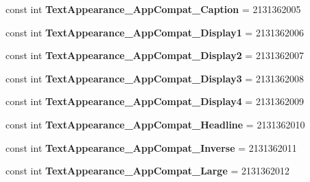 \begin{DoxyCompactItemize}
const int {\bfseries Text\+Appearance\+\_\+\+App\+Compat\+\_\+\+Caption} = 2131362005
\item 
\mbox{\label{class_pinned_app_1_1_droid_1_1_resource_1_1_style_a2f57dca80e42d93df5131cd962f5b9db}} 
const int {\bfseries Text\+Appearance\+\_\+\+App\+Compat\+\_\+\+Display1} = 2131362006
\item 
\mbox{\label{class_pinned_app_1_1_droid_1_1_resource_1_1_style_af2307b2f225c46a535f208bccf98fc51}} 
const int {\bfseries Text\+Appearance\+\_\+\+App\+Compat\+\_\+\+Display2} = 2131362007
\item 
\mbox{\label{class_pinned_app_1_1_droid_1_1_resource_1_1_style_a1ea5ccfacbe129d844dbea95ce0690ee}} 
const int {\bfseries Text\+Appearance\+\_\+\+App\+Compat\+\_\+\+Display3} = 2131362008
\item 
\mbox{\label{class_pinned_app_1_1_droid_1_1_resource_1_1_style_aa324ac75b9dd474fefa1ec75901c7c6b}} 
const int {\bfseries Text\+Appearance\+\_\+\+App\+Compat\+\_\+\+Display4} = 2131362009
\item 
\mbox{\label{class_pinned_app_1_1_droid_1_1_resource_1_1_style_a91b09d06fe0bf2c598e8fa3d52702df8}} 
const int {\bfseries Text\+Appearance\+\_\+\+App\+Compat\+\_\+\+Headline} = 2131362010
\item 
\mbox{\label{class_pinned_app_1_1_droid_1_1_resource_1_1_style_a70f14dd90b14de4a900332b146aa1db2}} 
const int {\bfseries Text\+Appearance\+\_\+\+App\+Compat\+\_\+\+Inverse} = 2131362011
\item 
\mbox{\label{class_pinned_app_1_1_droid_1_1_resource_1_1_style_af1bb9f77cbe3e9980fe7eb5d93367453}} 
const int {\bfseries Text\+Appearance\+\_\+\+App\+Compat\+\_\+\+Large} = 2131362012
\item 
\mbox{\label{class_pinned_app_1_1_droid_1_1_resource_1_1_style_a3492653ecfdefc78cff1fce51baac675}} 

\end{DoxyCompactItemize}
